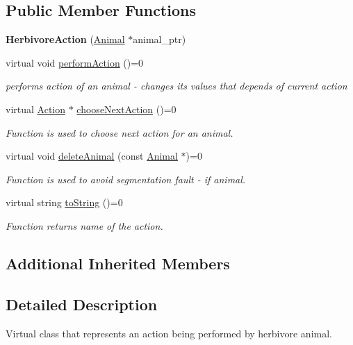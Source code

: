 \subsection*{Public Member Functions}
\begin{DoxyCompactItemize}
\item 
\hypertarget{class_herbivore_action_ad9541eff36921c0f14a6e3a755099baa}{}{\bfseries Herbivore\+Action} (\hyperlink{class_animal}{Animal} $\ast$animal\+\_\+ptr)\label{class_herbivore_action_ad9541eff36921c0f14a6e3a755099baa}

\item 
virtual void \hyperlink{class_herbivore_action_a85823422b73721792c11abdfbb02acc7}{perform\+Action} ()=0
\begin{DoxyCompactList}\small\item\em performs action of an animal -\/ changes it\textquotesingle{}s values that depends of current action \end{DoxyCompactList}\item 
virtual \hyperlink{class_action}{Action} $\ast$ \hyperlink{class_herbivore_action_aa5b97dfe80450e8c340158d864b4aae8}{choose\+Next\+Action} ()=0
\begin{DoxyCompactList}\small\item\em Function is used to choose next action for an animal. \end{DoxyCompactList}\item 
virtual void \hyperlink{class_herbivore_action_a62d0620d0e29fd560260cbc0f9f81abb}{delete\+Animal} (const \hyperlink{class_animal}{Animal} $\ast$)=0
\begin{DoxyCompactList}\small\item\em Function is used to avoid segmentation fault -\/ if animal. \end{DoxyCompactList}\item 
virtual string \hyperlink{class_herbivore_action_a69260348107b56b677b4e50375a25774}{to\+String} ()=0
\begin{DoxyCompactList}\small\item\em Function returns name of the action. \end{DoxyCompactList}\end{DoxyCompactItemize}
\subsection*{Additional Inherited Members}


\subsection{Detailed Description}
Virtual class that represents an action being performed by herbivore animal. 

